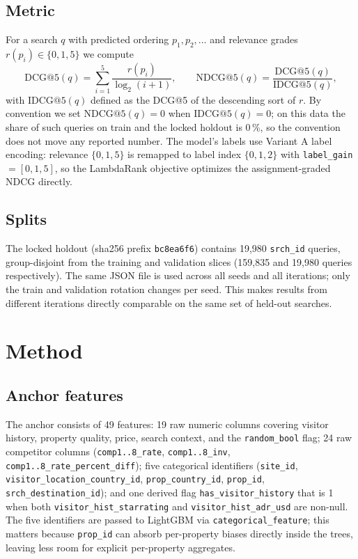\documentclass[runningheads]{llncs}
\begin{document}
\subsection{Metric}
\label{sec:metric}

For a search $q$ with predicted ordering $p_1, p_2, \dots$ and
relevance grades $r(p_i) \in \{0, 1, 5\}$ we compute
\begin{equation}
\text{DCG@5}(q) = \sum_{i=1}^{5} \frac{r(p_i)}{\log_2(i + 1)},
\qquad
\text{NDCG@5}(q) = \frac{\text{DCG@5}(q)}{\text{IDCG@5}(q)} ,
\end{equation}
with $\text{IDCG@5}(q)$ defined as the DCG@5 of the descending
sort of $r$. By convention we set $\text{NDCG@5}(q) = 0$ when
$\text{IDCG@5}(q) = 0$; on this data the share of such queries on
train and the locked holdout is 0\,\%, so the convention does not
move any reported number. The model's labels use Variant A label
encoding: relevance $\{0, 1, 5\}$ is remapped to label index
$\{0, 1, 2\}$ with \texttt{label\_gain}\,$=[0, 1, 5]$, so the
LambdaRank objective optimizes the assignment-graded NDCG directly.

\subsection{Splits}
\label{sec:splits}

The locked holdout (sha256 prefix \texttt{bc8ea6f6}) contains
19{,}980 \texttt{srch\_id} queries, group-disjoint from the
training and validation slices (159{,}835 and 19{,}980 queries
respectively). The same JSON file is used across all seeds and all
iterations; only the train and validation rotation changes per seed.
This makes results from different iterations directly comparable
on the same set of held-out searches.

\section{Method}
\label{sec:method}

\subsection{Anchor features}
\label{sec:anchor}

The anchor consists of 49 features: 19 raw numeric columns
covering visitor history, property quality, price, search context,
and the \texttt{random\_bool} flag; 24 raw competitor columns
(\texttt{comp1..8\_rate}, \texttt{comp1..8\_inv},
\texttt{comp1..8\_rate\_percent\_diff}); five categorical
identifiers (\texttt{site\_id},
\texttt{visitor\_location\_country\_id},
\texttt{prop\_country\_id}, \texttt{prop\_id},
\texttt{srch\_destination\_id}); and one derived flag
\texttt{has\_visitor\_history} that is 1 when both
\texttt{visitor\_hist\_starrating} and
\texttt{visitor\_hist\_adr\_usd} are non-null. The five identifiers
are passed to LightGBM via \texttt{categorical\_feature}; this
matters because \texttt{prop\_id} can absorb per-property biases
directly inside the trees, leaving less room for explicit
per-property aggregates.
\end{document}
